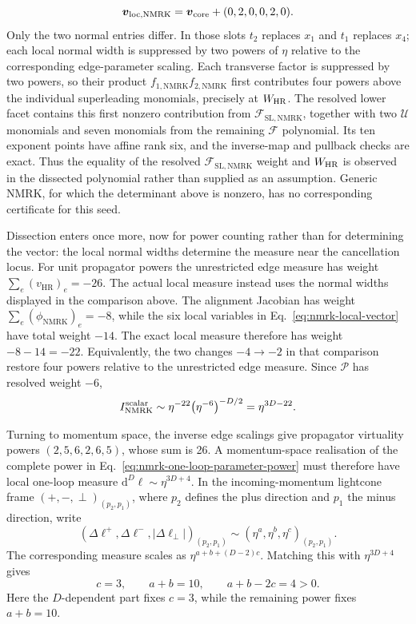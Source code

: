 \documentclass[a4paper,11pt]{article}
\newcommand{\HR}{\mathrm{HR}}
\newcommand{\WHR}{W_{\rm HR}}
\newcommand{\dd}{\mathrm d}
\begin{document}
\[
 \boldsymbol v_{\rm loc,NMRK}
 =\boldsymbol v_{\rm core}+(0,2,0,0,2,0).
\]
Only the two normal entries differ.  In those slots \(t_2\) replaces \(x_1\)
and \(t_1\) replaces \(x_4\); each local normal width is suppressed by two
powers of \(\eta\) relative to the corresponding edge-parameter scaling.
Each transverse factor is suppressed by two powers, so their product
\(f_{1,\mathrm{NMRK}}f_{2,\mathrm{NMRK}}\) first contributes four powers
above the individual
superleading monomials, precisely at \(\WHR\).  The resolved lower facet
contains this first nonzero contribution from
\(\mathcal F_{\mathrm{SL,NMRK}}\), together with two
\(\mathcal U\) monomials and seven monomials from the remaining
\(\mathcal F\) polynomial.  Its ten exponent points have affine rank six,
and the inverse-map and pullback checks are exact.  Thus the equality of the
resolved \(\mathcal F_{\mathrm{SL,NMRK}}\) weight and \(\WHR\) is observed
in the dissected
polynomial rather than supplied as an assumption.  Generic NMRK, for which
the determinant above is nonzero, has no corresponding certificate for this
seed.

Dissection enters once more, now for power counting rather than for
determining the vector: the local normal widths determine the measure near
the cancellation locus.  For unit propagator powers the
unrestricted edge measure has
weight \(\sum_e(v_{\HR})_e=-26\).  The actual local measure instead uses the
normal widths displayed in the comparison above.  The
alignment Jacobian has weight
\(\sum_e(\phi_{\mathrm{NMRK}})_e=-8\), while the six local variables in
Eq.~\eqref{eq:nmrk-local-vector} have total weight \(-14\).  The exact local
measure therefore has weight \(-8-14=-22\).  Equivalently, the two changes
\(-4\to-2\) in that comparison restore four powers
relative to the unrestricted edge measure.  Since
\(\mathcal P\) has resolved weight \(-6\),
\begin{equation}
 I_{\mathrm{NMRK}}^{\rm scalar}\sim
 \eta^{-22}\bigl(\eta^{-6}\bigr)^{-D/2}
 =\eta^{3D-22}.
 \label{eq:nmrk-one-loop-parameter-power}
\end{equation}

Turning to momentum space, the inverse edge scalings give propagator virtuality powers
\((2,5,6,2,6,5)\), whose sum is 26.  A momentum-space realisation of the
complete power in Eq.~\eqref{eq:nmrk-one-loop-parameter-power} must therefore
have local one-loop measure \(\dd^D\ell\sim\eta^{3D+4}\).  In the incoming-momentum
lightcone frame \((+,-,\perp)_{(p_2,p_1)}\), where \(p_2\) defines the plus
direction and \(p_1\) the minus direction, write
\[
 (\Delta\ell^+,\Delta\ell^-,|\Delta\ell_\perp|)_{(p_2,p_1)}
 \sim(\eta^a,\eta^b,\eta^c)_{(p_2,p_1)}.
\]
The corresponding measure scales as
\(\eta^{a+b+(D-2)c}\).
Matching this with \(\eta^{3D+4}\) gives
\begin{equation}
 c=3,\qquad a+b=10,\qquad a+b-2c=4>0.
 \label{eq:nmrk-one-loop-glauber-width}
\end{equation}
Here the \(D\)-dependent part fixes \(c=3\), while the remaining power fixes
\(a+b=10\).
\end{document}
